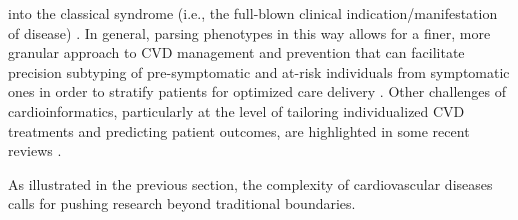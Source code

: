 \documentclass[letter]{bib}
\begin{document}
into the classical syndrome (i.e., the full-blown clinical indication/manifestation of disease) \citep{Cranley:2018:New}.  In general, parsing phenotypes in this way allows for a finer, more granular approach to CVD management and prevention that can facilitate precision subtyping of pre-symptomatic and at-risk individuals from symptomatic ones in order to stratify patients for optimized care delivery \citep{Johnson:2017:Enabling}.  Other challenges of cardioinformatics, particularly at the level of tailoring individualized CVD treatments and predicting patient outcomes, are highlighted in some recent reviews \cite{Meder:2016:Computational,Krittanawong:2018:Big,Niederer:2019:Computational,Krittanawong:2019:How,Trayanova:2019:From}.     
	
	As illustrated in the previous section, the complexity of cardiovascular diseases calls for pushing research beyond traditional boundaries.
\end{document}
